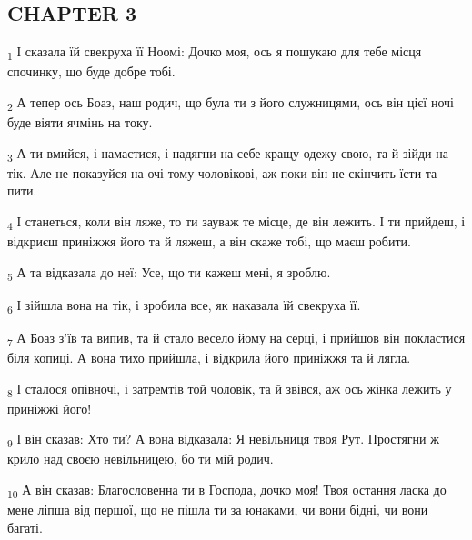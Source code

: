 \subsection{CHAPTER 3}
\begin{tcolorbox}
\textsubscript{1} І сказала їй свекруха її Ноомі: Дочко моя, ось я пошукаю для тебе місця спочинку, що буде добре тобі.
\end{tcolorbox}
\begin{tcolorbox}
\textsubscript{2} А тепер ось Боаз, наш родич, що була ти з його служницями, ось він цієї ночі буде віяти ячмінь на току.
\end{tcolorbox}
\begin{tcolorbox}
\textsubscript{3} А ти вмийся, і намастися, і надягни на себе кращу одежу свою, та й зійди на тік. Але не показуйся на очі тому чоловікові, аж поки він не скінчить їсти та пити.
\end{tcolorbox}
\begin{tcolorbox}
\textsubscript{4} І станеться, коли він ляже, то ти зауваж те місце, де він лежить. І ти прийдеш, і відкриєш приніжжя його та й ляжеш, а він скаже тобі, що маєш робити.
\end{tcolorbox}
\begin{tcolorbox}
\textsubscript{5} А та відказала до неї: Усе, що ти кажеш мені, я зроблю.
\end{tcolorbox}
\begin{tcolorbox}
\textsubscript{6} І зійшла вона на тік, і зробила все, як наказала їй свекруха її.
\end{tcolorbox}
\begin{tcolorbox}
\textsubscript{7} А Боаз з'їв та випив, та й стало весело йому на серці, і прийшов він покластися біля копиці. А вона тихо прийшла, і відкрила його приніжжя та й лягла.
\end{tcolorbox}
\begin{tcolorbox}
\textsubscript{8} І сталося опівночі, і затремтів той чоловік, та й звівся, аж ось жінка лежить у приніжжі його!
\end{tcolorbox}
\begin{tcolorbox}
\textsubscript{9} І він сказав: Хто ти? А вона відказала: Я невільниця твоя Рут. Простягни ж крило над своєю невільницею, бо ти мій родич.
\end{tcolorbox}
\begin{tcolorbox}
\textsubscript{10} А він сказав: Благословенна ти в Господа, дочко моя! Твоя остання ласка до мене ліпша від першої, що не пішла ти за юнаками, чи вони бідні, чи вони багаті.
\end{tcolorbox}
